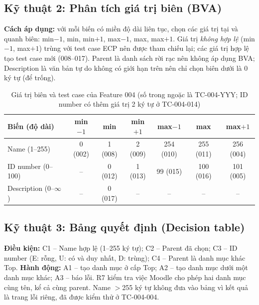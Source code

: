 \documentclass[12pt,a4paper]{article}
\begin{document}
\subsection{Kỹ thuật 2: Phân tích giá trị biên (BVA)}
\textbf{Cách áp dụng:} với mỗi biến có miền độ dài liên tục, chọn các giá trị tại và quanh biên: min$-1$, min, min$+1$, max$-1$, max, max$+1$.
Giá trị \emph{không hợp lệ} (min$-1$, max$+1$) trùng với test case ECP nên được tham chiếu lại; các giá trị hợp lệ tạo test case mới (008--017).
Parent là danh sách rời rạc nên không áp dụng BVA; Description là văn bản tự do không có giới hạn trên nên chỉ chọn biên dưới là 0 ký tự (để trống).

\begin{table}[H]
\centering\footnotesize
\begin{tabular}{|l|c|c|c|c|c|c|}
\hline
\rowcolor{gray!15}\textbf{Biến (độ dài)} & \textbf{min$-1$} & \textbf{min} & \textbf{min$+1$} & \textbf{max$-1$} & \textbf{max} & \textbf{max$+1$} \\ \hline
Name (1--255) & 0 (002) & 1 (008) & 2 (009) & 254 (010) & 255 (011) & 256 (004) \\ \hline
ID number (0--100) & -- & 0 (012) & 1 (013) & 99 (015) & 100 (016) & 101 (005) \\ \hline
Description (0--$\infty$) & -- & 0 (017) & -- & -- & -- & -- \\ \hline
\end{tabular}
\caption{Giá trị biên và test case của Feature 004 (số trong ngoặc là TC-004-YYY; ID number có thêm giá trị 2 ký tự ở TC-004-014)}
\end{table}

\subsection{Kỹ thuật 3: Bảng quyết định (Decision table)}
\textbf{Điều kiện:} C1 -- Name hợp lệ (1--255 ký tự); C2 -- Parent đã chọn; C3 -- ID number (E: rỗng, U: có và duy nhất, D: trùng);
C4 -- Parent là danh mục khác Top. \textbf{Hành động:} A1 -- tạo danh mục ở cấp Top; A2 -- tạo danh mục dưới một danh mục khác; A3 -- báo lỗi.
R7 kiểm tra việc Moodle cho phép hai danh mục cùng tên, kể cả cùng parent. Name $>$255 ký tự không đưa vào bảng vì kết quả là trang lỗi riêng,
đã được kiểm thử ở TC-004-004.
\end{document}

